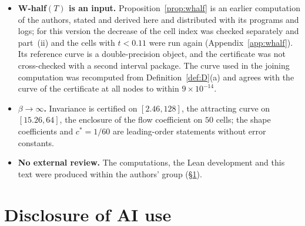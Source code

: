 \documentclass[11pt,a4paper]{article}
\theoremstyle{definition}
\theoremstyle{remark}
\begin{document}
\begin{itemize}
\item \textbf{W-half$(T)$ is an input.} Proposition~\ref{prop:whalf} is an earlier computation of the authors, stated and derived here and distributed with its programs and logs; for this version the decrease of the cell index was checked separately and part~(ii) and the cells with $t<0.11$ were run again (Appendix~\ref{app:whalf}). Its reference curve is a double-precision object, and the certificate was not cross-checked with a second interval package. The curve used in the joining computation was recomputed from Definition~\ref{def:D}(a) and agrees with the curve of the certificate at all nodes to within $9\times10^{-14}$.
\item \textbf{$\beta\to\infty$.} Invariance is certified on $[2.46,128]$, the attracting curve on $[15.26,64]$, the enclosure of the flow coefficient on $50$ cells; the shape coefficients and $c^*=1/60$ are leading-order statements without error constants.
\item \textbf{No external review.} The computations, the Lean development and this text were produced within the authors' group (\S\ref{sec:ai}).
\end{itemize}

\section{Disclosure of AI use}\label{sec:ai}
\end{document}
